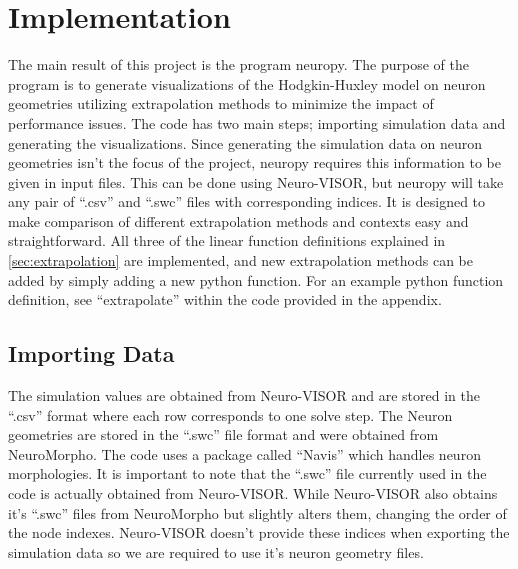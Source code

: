 
\section{Implementation}%
\label{sec:implementation}

The main result of this project is the program neuropy\cite{neuropy}.
The purpose of the program is to generate visualizations of the Hodgkin-Huxley model on neuron geometries utilizing extrapolation methods to minimize the impact of performance issues.
The code has two main steps; importing simulation data and generating the visualizations.
Since generating the simulation data on neuron geometries isn't the focus of the project, neuropy requires this information to be given in input files.
This can be done using Neuro-VISOR, but neuropy will take any pair of ``.csv'' and ``.swc'' files with corresponding indices.
It is designed to make comparison of different extrapolation methods and contexts easy and straightforward. 
All three of the linear function definitions explained in \cref{sec:extrapolation} are implemented, and new extrapolation methods can be added by simply adding a new python function.
For an example python function definition, see ``extrapolate'' within the code provided in the appendix.


\subsection{Importing Data}%
\label{sub:importing_data}
The simulation values are obtained from Neuro-VISOR\cite{neuroVISOR} and are stored in the ``.csv'' format where each row corresponds to one solve step.
The Neuron geometries are stored in the ``.swc'' file format\cite{swc} and were obtained from NeuroMorpho\cite{neuroMorpho}.
The code uses a package called ``Navis'' which handles neuron morphologies\cite{navis}.
It is important to note that the ``.swc'' file currently used in the code is actually obtained from Neuro-VISOR.
While Neuro-VISOR also obtains it's ``.swc'' files from NeuroMorpho but slightly alters them, changing the order of the node indexes\cite{neuropy}.
Neuro-VISOR doesn't provide these indices when exporting the simulation data so we are required to use it's neuron geometry files.


